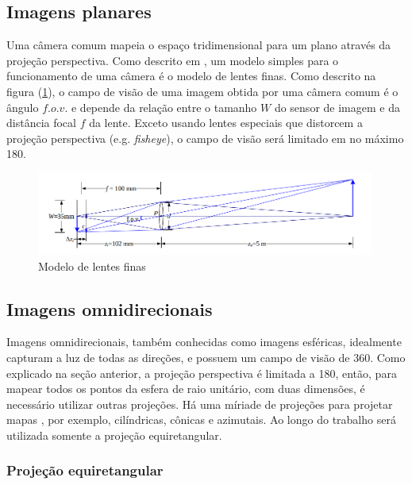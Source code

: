 \documentclass[cic,tc]{iiufrgs}
\begin{document}
\subsection{Imagens planares}

Uma câmera comum mapeia o espaço tridimensional para um plano através da projeção perspectiva. Como descrito em \citet{Szeliski}, um modelo simples para o funcionamento de uma câmera é o modelo de lentes finas. Como descrito na figura (\ref{fig:lens-fov}), o campo de visão de uma imagem obtida por uma câmera comum é o ângulo $f.o.v.$ e depende da relação entre o tamanho $W$ do sensor de imagem e da distância focal $f$ da lente. Exceto usando lentes especiais que distorcem a projeção perspectiva (e.g. \textit{fisheye}), o campo de visão será limitado em no máximo 180\degree .
\begin{figure}
    \caption{Modelo de lentes finas}
    \begin{center}
        \includegraphics[width=30em]{lens-fov.png}
    \end{center}
    \label{fig:lens-fov}
\end{figure}
\subsection{Imagens omnidirecionais}

Imagens omnidirecionais, também conhecidas como imagens esféricas, idealmente capturam a luz de todas as direções, e possuem um campo de visão de 360\degree. Como explicado na seção anterior, a projeção perspectiva é limitada a 180\degree, então, para mapear todos os pontos da esfera de raio unitário, com duas dimensões, é necessário utilizar outras projeções. Há uma míriade de projeções para projetar mapas \citep{sphereProjections}, por exemplo, cilíndricas, cônicas e azimutais. Ao longo do trabalho será utilizada somente a projeção equiretangular.

\subsubsection{Projeção equiretangular}
\end{document}
